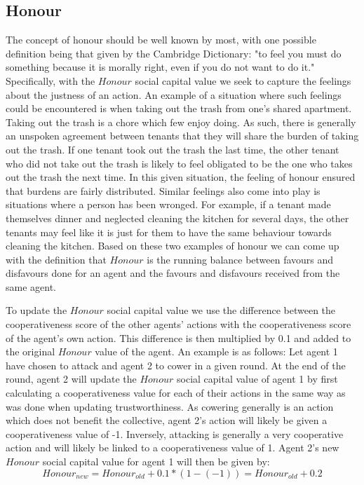\subsection{Honour}
\label{subsection:honour}

The concept of honour should be well known by most, with one possible definition being that given by the Cambridge Dictionary: "to feel you must do something because it is morally right, even if you do not want to do it." Specifically, with the $Honour$ social capital value we seek to capture the feelings about the justness of an action. An example of a situation where such feelings could be encountered is when taking out the trash from one's shared apartment. Taking out the trash is a chore which few enjoy doing. As such, there is generally an unspoken agreement between tenants that they will share the burden of taking out the trash. If one tenant took out the trash the last time, the other tenant who did not take out the trash is likely to feel obligated to be the one who takes out the trash the next time. In this given situation, the feeling of honour ensured that burdens are fairly distributed. Similar feelings also come into play is situations where a person has been wronged. For example, if a tenant made themselves dinner and neglected cleaning the kitchen for several days, the other tenants may feel like it is just for them to have the same behaviour towards cleaning the kitchen. Based on these two examples of honour we can come up with the definition that $Honour$ is the running balance between favours and disfavours done for an agent and the favours and disfavours received from the same agent. 

To update the $Honour$ social capital value we use the difference between the cooperativeness score of the other agents' actions with the cooperativeness score of the agent's own action. This difference is then multiplied by 0.1 and added to the original $Honour$ value of the agent. An example is as follows: Let agent 1 have chosen to attack and agent 2 to cower in a given round. At the end of the round, agent 2 will update the $Honour$ social capital value of agent 1 by first calculating a cooperativeness value for each of their actions in the same way as was done when updating trustworthiness. As cowering generally is an action which does not benefit the collective, agent 2's action will likely be given a cooperativeness value of -1. Inversely, attacking is generally a very cooperative action and will likely be linked to a cooperativeness value of 1. Agent 2's new $Honour$ social capital value for agent 1 will then be given by:
\begin{equation}
    Honour_{new} = Honour_{old} + 0.1*(1 - (-1)) = Honour_{old} + 0.2
\end{equation}

